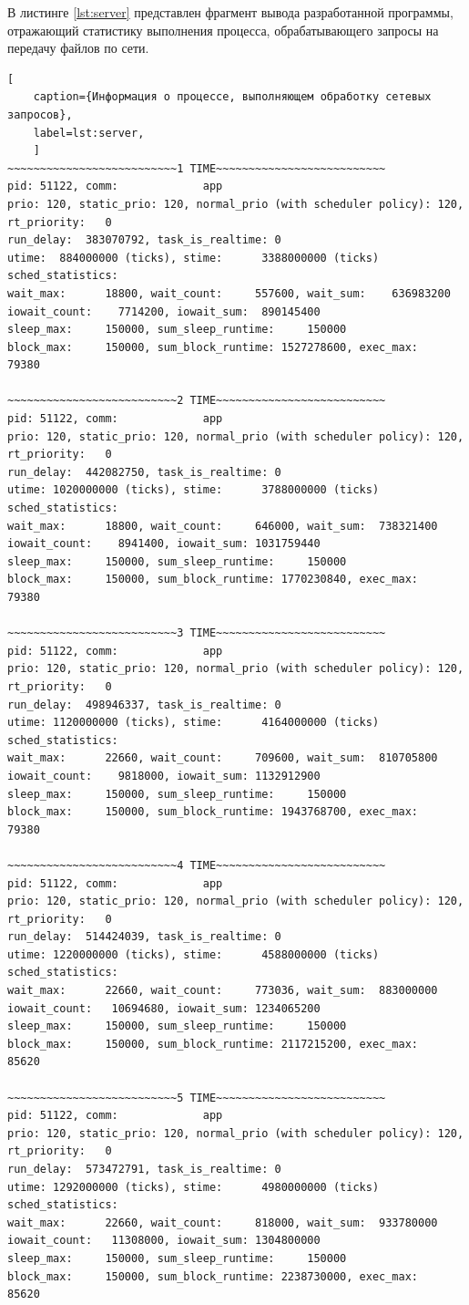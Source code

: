 В листинге \ref{lst:server} представлен фрагмент вывода разработанной программы, отражающий статистику выполнения процесса, обрабатывающего запросы на передачу файлов по сети.

\begin{lstlisting}[
	caption={Информация о процессе, выполняющем обработку сетевых запросов},
	label=lst:server,
	]
~~~~~~~~~~~~~~~~~~~~~~~~~~1 TIME~~~~~~~~~~~~~~~~~~~~~~~~~~
pid: 51122, comm:             app
prio: 120, static_prio: 120, normal_prio (with scheduler policy): 120, 
rt_priority:   0
run_delay:  383070792, task_is_realtime: 0
utime:  884000000 (ticks), stime:      3388000000 (ticks)
sched_statistics:
wait_max:      18800, wait_count:     557600, wait_sum:    636983200
iowait_count:    7714200, iowait_sum:  890145400
sleep_max:     150000, sum_sleep_runtime:     150000
block_max:     150000, sum_block_runtime: 1527278600, exec_max:      79380

~~~~~~~~~~~~~~~~~~~~~~~~~~2 TIME~~~~~~~~~~~~~~~~~~~~~~~~~~
pid: 51122, comm:             app
prio: 120, static_prio: 120, normal_prio (with scheduler policy): 120, 
rt_priority:   0
run_delay:  442082750, task_is_realtime: 0
utime: 1020000000 (ticks), stime:      3788000000 (ticks)
sched_statistics:
wait_max:      18800, wait_count:     646000, wait_sum:  738321400
iowait_count:    8941400, iowait_sum: 1031759440
sleep_max:     150000, sum_sleep_runtime:     150000
block_max:     150000, sum_block_runtime: 1770230840, exec_max:      79380

~~~~~~~~~~~~~~~~~~~~~~~~~~3 TIME~~~~~~~~~~~~~~~~~~~~~~~~~~
pid: 51122, comm:             app
prio: 120, static_prio: 120, normal_prio (with scheduler policy): 120, 
rt_priority:   0
run_delay:  498946337, task_is_realtime: 0
utime: 1120000000 (ticks), stime:      4164000000 (ticks)
sched_statistics:
wait_max:      22660, wait_count:     709600, wait_sum:  810705800
iowait_count:    9818000, iowait_sum: 1132912900
sleep_max:     150000, sum_sleep_runtime:     150000
block_max:     150000, sum_block_runtime: 1943768700, exec_max:      79380

~~~~~~~~~~~~~~~~~~~~~~~~~~4 TIME~~~~~~~~~~~~~~~~~~~~~~~~~~
pid: 51122, comm:             app
prio: 120, static_prio: 120, normal_prio (with scheduler policy): 120, 
rt_priority:   0
run_delay:  514424039, task_is_realtime: 0
utime: 1220000000 (ticks), stime:      4588000000 (ticks)
sched_statistics:
wait_max:      22660, wait_count:     773036, wait_sum:  883000000
iowait_count:   10694680, iowait_sum: 1234065200
sleep_max:     150000, sum_sleep_runtime:     150000
block_max:     150000, sum_block_runtime: 2117215200, exec_max:      85620

~~~~~~~~~~~~~~~~~~~~~~~~~~5 TIME~~~~~~~~~~~~~~~~~~~~~~~~~~
pid: 51122, comm:             app
prio: 120, static_prio: 120, normal_prio (with scheduler policy): 120, 
rt_priority:   0
run_delay:  573472791, task_is_realtime: 0
utime: 1292000000 (ticks), stime:      4980000000 (ticks)
sched_statistics:
wait_max:      22660, wait_count:     818000, wait_sum:  933780000
iowait_count:   11308000, iowait_sum: 1304800000
sleep_max:     150000, sum_sleep_runtime:     150000
block_max:     150000, sum_block_runtime: 2238730000, exec_max:      85620
\end{lstlisting}

